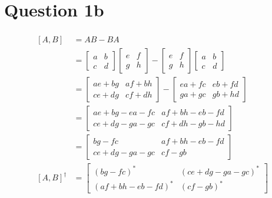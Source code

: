 \documentclass{article}
\begin{document}
\section*{Question 1b}
\begin{align*}
    \begin{split}
        [A, B] &= AB - BA \\
        &= 
        \begin{bmatrix}
            a & b \\ c & d
        \end{bmatrix}
        \begin{bmatrix}
            e & f \\ g & h
        \end{bmatrix} -
        \begin{bmatrix}
            e & f \\ g & h
        \end{bmatrix}
        \begin{bmatrix}
            a & b \\ c & d
        \end{bmatrix} \\
        &= 
        \begin{bmatrix} 
            ae + bg & af + bh \\ 
            ce + dg & cf + dh 
        \end{bmatrix} - 
        \begin{bmatrix} 
            ea + fc & eb + fd \\ 
            ga + gc & gb + hd 
        \end{bmatrix} \\
        &= \begin{bmatrix}
            ae + bg - ea - fc & af + bh - eb - fd \\
            ce + dg - ga - gc & cf + dh - gb - hd
        \end{bmatrix} \\
        &= \begin{bmatrix}
            bg - fc & af + bh - eb - fd \\
            ce + dg - ga - gc & cf - gb
        \end{bmatrix} \\
        [A, B]^{\dagger}
        &=    
        \begin{bmatrix} 
            (bg - fc)^* &  (ce + dg - ga - gc)^* \\
            (af + bh - eb - fd)^* & (cf - gb)^*
        \end{bmatrix} \\\\
    \end{split}
\end{align*}
\end{document}
